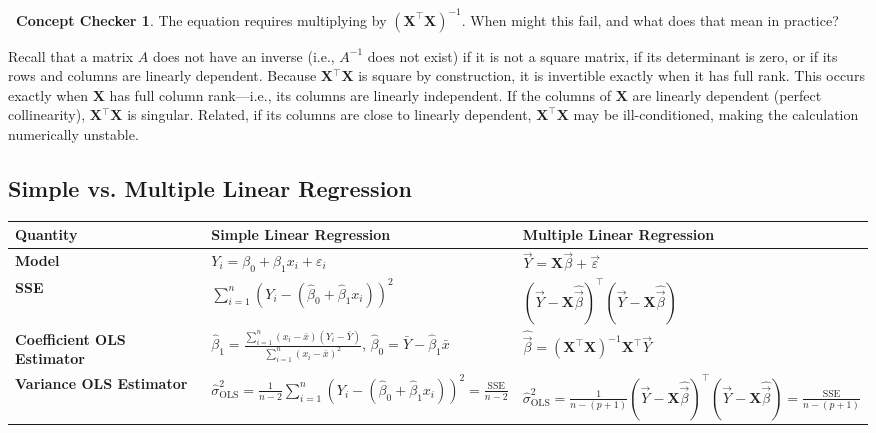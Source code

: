\documentclass[12pt,oneside]{article}
\newcommand{\OLS}{\text{OLS}}
\newcommand{\SSE}{\text{SSE}}
\theoremstyle{definition}
\newtheorem{concept}{\faPen \ Concept Checker}
\theoremstyle{remark}
\begin{document}
\begin{concept}
The equation requires multiplying by $(\boldsymbol{X}^{\top} \boldsymbol{X})^{-1}$. When might this fail, and what does that mean in practice?
\end{concept}

\begin{solutionbox}
Recall that a matrix $A$ does not have an inverse (i.e., $A^{-1}$ does not exist) if it is not a square matrix, if its determinant is zero, or if its rows and columns are linearly dependent. Because $\boldsymbol{X}{^\top} \boldsymbol{X}$ is square by construction, it is invertible exactly when it has full rank. This occurs exactly when $\boldsymbol{X}$ has full column rank—i.e., its columns are linearly independent. If the columns of $\boldsymbol{X}$ are linearly dependent (perfect collinearity), $\boldsymbol{X}{^\top} \boldsymbol{X}$ is singular. Related, if its columns are close to linearly dependent, $\boldsymbol{X}^{\top} \boldsymbol{X}$ may be ill-conditioned, making the calculation numerically unstable.
\end{solutionbox}

\subsection{Simple vs. Multiple Linear Regression}

\begin{center}
{
\normalsize
\renewcommand{\arraystretch}{1.5}
\begin{tabular}{p{3.25cm}|p{6cm}|p{6cm}}
\textbf{Quantity} & \textbf{Simple Linear Regression} & \textbf{Multiple Linear Regression} \\ \hline

\textbf{Model}
& $Y_i = \beta_0 + \beta_1 x_i + \varepsilon_i$
& $\vec{Y} = \boldsymbol{X} \vec{\beta} + \vec{\varepsilon}$ \\

\hline

\textbf{SSE}
& $\sum_{i = 1}^{n} (Y_i - (\hat{\beta}_0 + \hat{\beta}_1 x_i))^2$
& $(\vec{Y} - \boldsymbol{X} \widehat{\vec{\beta}})^{\top} (\vec{Y} - \boldsymbol{X} \widehat{\vec{\beta}})$ \\

\hline

\textbf{Coefficient OLS Estimator}
& $\hat{\beta}_{1} = \frac{\sum_{i = 1}^{n} (x_i - \bar{x})(Y_i - \bar{Y})}{\sum_{i = 1}^{n} (x_i - \bar{x})^2}$, $\hat{\beta}_{0} = \bar{Y} - \hat{\beta}_{1} \bar{x}$
& $\widehat{\vec{\beta}} = (\boldsymbol{X}^{\top} \boldsymbol{X})^{-1} \boldsymbol{X}^{\top} \vec{Y}$ \\

\hline

\textbf{Variance OLS Estimator}
& $\hat{\sigma}^2_{\OLS} = \frac{1}{n - 2} \sum_{i = 1}^{n} (Y_i - (\hat{\beta}_0 + \hat{\beta}_1 x_i))^2 = \frac{\SSE}{n - 2}$
& $\hat{\sigma}^2_{\OLS} = \frac{1}{n - (p + 1)} (\vec{Y} - \boldsymbol{X} \widehat{\vec{\beta}})^{\top} (\vec{Y} - \boldsymbol{X} \widehat{\vec{\beta}}) = \frac{\SSE}{n - (p + 1)}$
\end{tabular}
}
\end{center}
\end{document}
